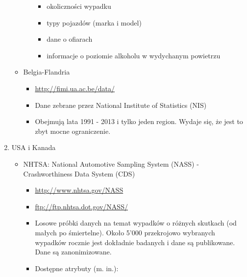 \begin{enumerate}
\begin{itemize}
\begin{itemize}
      \begin{itemize}
      \itemsep-14pt\parskip0pt
      \item
        okoliczności wypadku\\
      \item
        typy pojazdów (marka i model)\\
      \item
        dane o ofiarach\\
      \item
        informacje o poziomie alkoholu w wydychanym powietrzu\\
      \end{itemize}
    \end{itemize}
  \item
    Belgia-Flandria

    \begin{itemize}
    \itemsep-14pt\parskip0pt
    \item
      \url{http://fimi.ua.ac.be/data/}\\
    \item
      Dane zebrane przez National Institute of Statistics (NIS)\\
    \item
      Obejmują lata 1991 - 2013 i tylko jeden region. Wydaje się, że
      jest to zbyt mocne ograniczenie.
    \end{itemize}
  \end{itemize}
\item
  USA i Kanada

  \begin{itemize}
  \item
    NHTSA: National Automotive Sampling System (NASS) - Crashworthiness
    Data System (CDS)

    \begin{itemize}
    \item
      \url{http://www.nhtsa.gov/NASS}\\
    \item
      \url{ftp://ftp.nhtsa.dot.gov/NASS/}\\
    \item
      Losowe próbki danych na temat wypadków o różnych skutkach (od
      małych po śmiertelne). Około 5'000 przekrojowo wybranych wypadków
      rocznie jest dokładnie badanych i dane są publikowane. Dane są
      zanonimizowane.\\
    \item
      Dostępne atrybuty (m. in.):


\end{itemize}
\end{itemize}
\end{enumerate}
